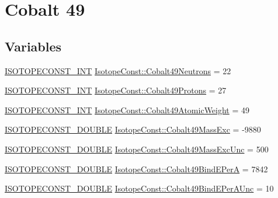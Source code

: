 \hypertarget{group___isotope_const-_cobalt-_co49}{}\section{Cobalt 49}
\label{group___isotope_const-_cobalt-_co49}
\subsection*{Variables}
\begin{DoxyCompactItemize}
\item 
\mbox{\hyperlink{group___isotope_const-_macros_ga5f18360b3e99483a35c32d789e62621c}{I\+S\+O\+T\+O\+P\+E\+C\+O\+N\+S\+T\+\_\+\+I\+NT}} \mbox{\hyperlink{group___isotope_const-_cobalt-_co49_gaac2d5960ed1d52ea64ca668153d8918d}{Isotope\+Const\+::\+Cobalt49\+Neutrons}} = 22
\item 
\mbox{\hyperlink{group___isotope_const-_macros_ga5f18360b3e99483a35c32d789e62621c}{I\+S\+O\+T\+O\+P\+E\+C\+O\+N\+S\+T\+\_\+\+I\+NT}} \mbox{\hyperlink{group___isotope_const-_cobalt-_co49_ga9f82733183208f19dfdb1ae45bd5ec80}{Isotope\+Const\+::\+Cobalt49\+Protons}} = 27
\item 
\mbox{\hyperlink{group___isotope_const-_macros_ga5f18360b3e99483a35c32d789e62621c}{I\+S\+O\+T\+O\+P\+E\+C\+O\+N\+S\+T\+\_\+\+I\+NT}} \mbox{\hyperlink{group___isotope_const-_cobalt-_co49_gaeefbf2ae11376bb822a3e8fe986651d2}{Isotope\+Const\+::\+Cobalt49\+Atomic\+Weight}} = 49
\item 
\mbox{\hyperlink{group___isotope_const-_macros_ga8f45a7272ce02c0b4c65c44636ed719a}{I\+S\+O\+T\+O\+P\+E\+C\+O\+N\+S\+T\+\_\+\+D\+O\+U\+B\+LE}} \mbox{\hyperlink{group___isotope_const-_cobalt-_co49_ga79b1d27378fefcbbcd8511824fa15691}{Isotope\+Const\+::\+Cobalt49\+Mass\+Exc}} = -\/9880
\item 
\mbox{\hyperlink{group___isotope_const-_macros_ga8f45a7272ce02c0b4c65c44636ed719a}{I\+S\+O\+T\+O\+P\+E\+C\+O\+N\+S\+T\+\_\+\+D\+O\+U\+B\+LE}} \mbox{\hyperlink{group___isotope_const-_cobalt-_co49_ga33e676344315599059c8c328035aeb18}{Isotope\+Const\+::\+Cobalt49\+Mass\+Exc\+Unc}} = 500
\item 
\mbox{\hyperlink{group___isotope_const-_macros_ga8f45a7272ce02c0b4c65c44636ed719a}{I\+S\+O\+T\+O\+P\+E\+C\+O\+N\+S\+T\+\_\+\+D\+O\+U\+B\+LE}} \mbox{\hyperlink{group___isotope_const-_cobalt-_co49_ga46986fb6b2032122e59d1df94921d90f}{Isotope\+Const\+::\+Cobalt49\+Bind\+E\+PerA}} = 7842
\item 
\mbox{\hyperlink{group___isotope_const-_macros_ga8f45a7272ce02c0b4c65c44636ed719a}{I\+S\+O\+T\+O\+P\+E\+C\+O\+N\+S\+T\+\_\+\+D\+O\+U\+B\+LE}} \mbox{\hyperlink{group___isotope_const-_cobalt-_co49_ga2db872d07cbf90f92f8de1b1b21465f7}{Isotope\+Const\+::\+Cobalt49\+Bind\+E\+Per\+A\+Unc}} = 10

\end{DoxyCompactItemize}
